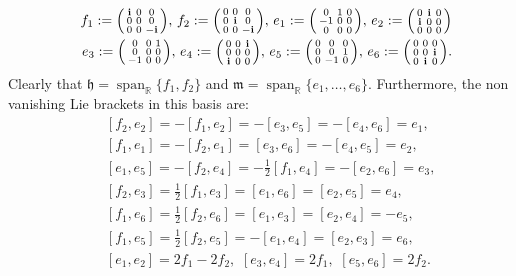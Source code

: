 \documentclass[preprint,12pt,1p]{elsarticle}
\theoremstyle{plain}
\theoremstyle{definition}
\newcommand{\h}{\mathfrak{h}}
\newcommand{\Span}{\operatorname{span}}
\numberwithin{equation}{section}
\begin{document}
\begin{eqnarray*}
&&f_1:=\begin{psmallmatrix}
\mathbf{i}&0&0\\
0&0&0\\
0&0&-\mathbf{i}
\end{psmallmatrix},\, f_2:=\begin{psmallmatrix}
0&0&0\\
0&\mathbf{i}&0\\
0&0&-\mathbf{i}
\end{psmallmatrix},\, e_1:=\begin{psmallmatrix}
0&1&0\\
-1&0&0\\
0&0&0
\end{psmallmatrix},\,e_2:=\begin{psmallmatrix}
0&\mathbf{i}&0\\
\mathbf{i}&0&0\\
0&0&0
\end{psmallmatrix}\\
&& e_3:=\begin{psmallmatrix}
0&0&1\\
0&0&0\\
-1&0&0
\end{psmallmatrix},\,e_4:=\begin{psmallmatrix}
0&0&\mathbf{i}\\
0&0&0\\
\mathbf{i}&0&0
\end{psmallmatrix},\, e_5:=\begin{psmallmatrix}
0&0&0\\
0&0&1\\
0&-1&0
\end{psmallmatrix},\,e_6:=\begin{psmallmatrix}
0&0&0\\
0&0&\mathbf{i}\\
0&\mathbf{i}&0
\end{psmallmatrix}.
\end{eqnarray*}
Clearly that $\h=\Span_{\mathbb{R}}\{f_1,f_2\}$ and $\mathfrak{m}=\Span_{\mathbb{R}}\{e_1,\ldots,e_6\}$. Furthermore, the non vanishing Lie brackets in this basis are:
\begin{eqnarray*}
&&[f_2,e_2]=-[f_1,e_2]=-[e_3,e_5]=-[e_4,e_6]=e_1,\\
&&[f_1,e_1]=-[f_2,e_1]=[e_3,e_6]=-[e_4,e_5]=e_2,\\
&&[e_1,e_5]=-[f_2,e_4]=-\tfrac{1}{2}[f_1,e_4]=-[e_2,e_6]=e_3,\\
&&[f_2,e_3]=\tfrac{1}{2}[f_1,e_3]=[e_1,e_6]=[e_2,e_5]=e_4,\\
&&[f_1,e_6]=\tfrac{1}{2}[f_2,e_6]=[e_1,e_3]=[e_2,e_4]=-e_5,\\
&&[f_1,e_5]=\tfrac{1}{2}[f_2,e_5]=-[e_1,e_4]=[e_2,e_3]=e_6,\\
&&[e_1,e_2]=2f_1-2f_2,\,\,[e_3,e_4]=2f_1,\,\,[e_5,e_6]=2f_2.
\end{eqnarray*}
\end{document}
